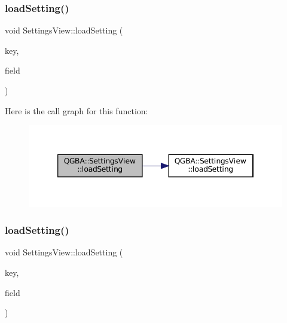 \subsubsection{\texorpdfstring{load\+Setting()}{loadSetting()}\hspace{0.1cm}{\footnotesize\ttfamily [3/7]}}
{\footnotesize\ttfamily void Settings\+View\+::load\+Setting (\begin{DoxyParamCaption}\item[{const char $\ast$}]{key,  }\item[{Q\+Double\+Spin\+Box $\ast$}]{field }\end{DoxyParamCaption})\hspace{0.3cm}{\ttfamily [private]}}

Here is the call graph for this function\+:
\nopagebreak
\begin{figure}[H]
\begin{center}
\leavevmode
\includegraphics[width=346pt]{class_q_g_b_a_1_1_settings_view_aabce42d869bce442ffc165e27c865034_cgraph}
\end{center}
\end{figure}
\mbox{\label{class_q_g_b_a_1_1_settings_view_aae9e9c3c12f0f635735dd18c90633f47}} 
\subsubsection{\texorpdfstring{load\+Setting()}{loadSetting()}\hspace{0.1cm}{\footnotesize\ttfamily [4/7]}}
{\footnotesize\ttfamily void Settings\+View\+::load\+Setting (\begin{DoxyParamCaption}\item[{const char $\ast$}]{key,  }\item[{Q\+Line\+Edit $\ast$}]{field }\end{DoxyParamCaption})\hspace{0.3cm}{\ttfamily [private]}}

